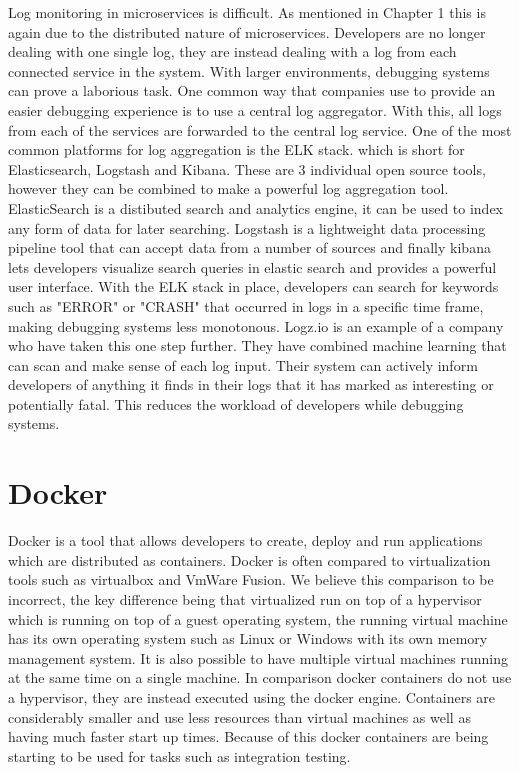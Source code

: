 Log monitoring in microservices is difficult. As mentioned in Chapter 1 this is again due to the distributed nature of microservices. Developers are no longer dealing with one single log, they are instead dealing with a log from each connected service in the system. With larger environments, debugging systems can prove a laborious task. One common way that companies use to provide an easier debugging experience is to use a central log aggregator. With this, all logs from each of the services are forwarded to the central log service. One of the most common platforms for log aggregation is the ELK stack. which is short for Elasticsearch, Logstash and Kibana. These are 3 individual open source tools, however they can be combined to make a powerful log aggregation tool. ElasticSearch is a distibuted search and analytics engine, it can be used to index any form of data for later searching. Logstash is a lightweight data processing pipeline tool that can accept data from a number of sources and finally kibana lets developers visualize search queries in elastic search and provides a powerful user interface. With the ELK stack in place, developers can search for keywords such as "ERROR" or "CRASH" that occurred in logs in a specific time frame, making debugging systems less monotonous. Logz.io is an example of a company who have taken this one step further. They have combined machine learning that can scan and make sense of each log input. Their system can actively inform developers of anything it finds in their logs that it has marked as interesting or potentially fatal. This reduces the workload of developers while debugging systems.

\section{Docker}

Docker is a tool that allows developers to create, deploy and run applications which are distributed as containers. Docker is often compared to virtualization tools such as virtualbox and VmWare Fusion. We believe this comparison to be incorrect, the key difference being that virtualized run on top of a hypervisor which is running on top of a guest operating system, the running virtual machine has its own operating system such as Linux or Windows with its own memory management system. It is also possible to have multiple virtual machines running at the same time on a single machine. In comparison docker containers do not use a hypervisor, they are instead executed using the docker engine. Containers are considerably smaller and use less resources than virtual machines as well as having much faster start up times. Because of this docker containers are being starting to be used for tasks such as integration testing.

